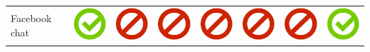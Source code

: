 \documentclass[10pt,foldmark,tumble]{leaflet}
\begin{document}
\begin{center}
{{\begin{tabular}{ L{2cm} | C{2cm} | C{2cm} | C{2cm} | C{2cm} | C{2cm} | C{2cm} | C{2cm} }
Facebook chat & \includegraphics[scale=0.1]{pics/haken.png} & \includegraphics[scale=0.1]{pics/nohaken.png} & \includegraphics[scale=0.1]{pics/nohaken.png} & \includegraphics[scale=0.1]{pics/nohaken.png} & \includegraphics[scale=0.1]{pics/nohaken.png} & \includegraphics[scale=0.1]{pics/nohaken.png} & \includegraphics[scale=0.1]{pics/haken.png} \tabularnewline

\end{tabular}}}
\end{center}
\end{document}

